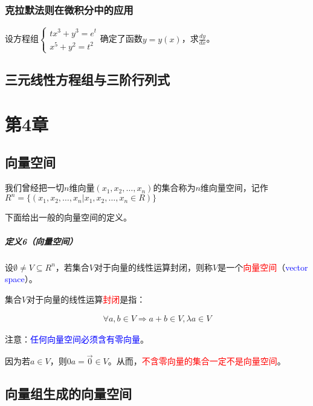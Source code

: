 \documentclass[UTF8]{ctexbook}
\begin{document}
\subsection{克拉默法则在微积分中的应用}

设方程组$\begin{cases}
tx^{3}+y^{3}=e^{t}\\
x^{5}+y^{2}=t^{2}
\end{cases}$确定了函数$y=y(x)$，求$\frac{dy}{dx}$。

\section{三元线性方程组与三阶行列式}

\chapter{第4章}

\section{向量空间}

我们曾经把一切$n$维向量$(x_{1},x_{2},\dots,x_{n})$的集合称为$n$维向量空间，记作$R^{n}=\{ (x_{1},x_{2},\dots,x_{n} | x_{1},x_{2},\dots,x_{n} \in R)\}$

下面给出一般的向量空间的定义。

\paragraph{定义6（向量空间）} 设$\emptyset \neq V \subseteq R^{n}$，若集合$V$对于向量的线性运算封闭，则称$V$是一个\textcolor{red}{向量空间}（\textcolor{blue}{vector space}）。

集合$V$对于向量的线性运算\textcolor{red}{封闭}是指：

\begin{equation}
\begin{aligned}
\forall a,b \in V \Rightarrow a+b \in V, \lambda a \in V
\end{aligned}
\end{equation}

注意：\textcolor{blue}{任何向量空间必须含有零向量}。

因为若$a \in V$，则$0a=\vec{0} \in V$。从而，\textcolor{red}{不含零向量的集合一定不是向量空间}。

\section{向量组生成的向量空间}
\end{document}
